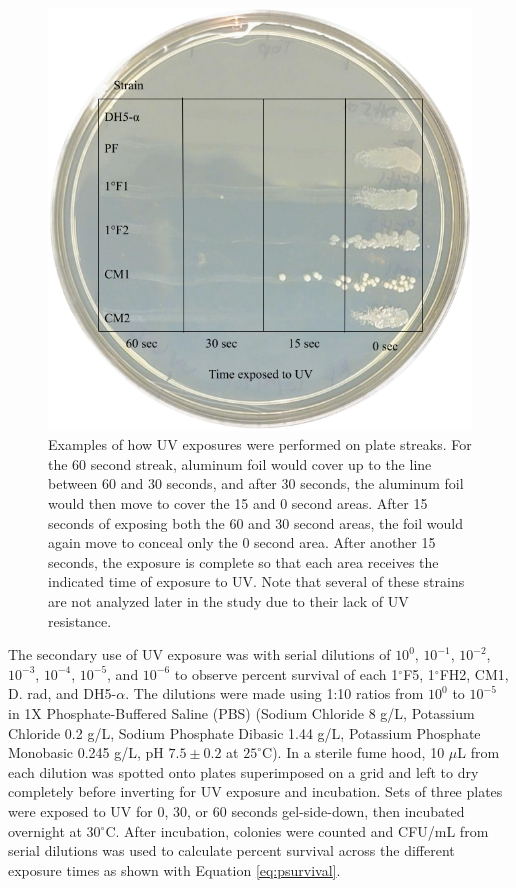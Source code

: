 \documentclass[12pt,twoside]{reedthesis}
\begin{document}
\begin{figure}[t]
\centering
\includegraphics[width=\textwidth]{figure/StreakUV.png}
\caption[Streak UV]{Examples of how UV exposures were performed on plate streaks. For the 60 second streak, aluminum foil would cover up to the line between 60 and 30 seconds, and after 30 seconds, the aluminum foil would then move to cover the 15 and 0 second areas. After 15 seconds of exposing both the 60 and 30 second areas, the foil would again move to conceal only the 0 second area. After another 15 seconds, the exposure is complete so that each area receives the indicated time of exposure to UV. Note that several of these strains are not analyzed later in the study due to their lack of UV resistance.}
\label{fig:StreakUV}
\end{figure}
The secondary use of UV exposure was with serial dilutions of \(10^0\), \(10^{-1}\), \(10^{-2}\), \(10^{-3}\), \(10^{-4}\), \(10^{-5}\), and \(10^{-6}\) to observe percent survival of each 1\(^{\circ}\)F5, 1\(^{\circ}\)FH2, CM1, D. rad, and DH5-\(\alpha\). The dilutions were made using 1:10 ratios from \(10^0\) to \(10^{-5}\) in 1X Phosphate-Buffered Saline (PBS) (Sodium Chloride 8 g/L, Potassium Chloride 0.2 g/L, Sodium Phosphate Dibasic 1.44 g/L, Potassium Phosphate Monobasic 0.245 g/L, pH \(7.5 \pm 0.2\) at \(25^{\circ}\)C). In a sterile fume hood, 10 \(\mu\)L from each dilution was spotted onto plates superimposed on a grid and left to dry completely before inverting for UV exposure and incubation. Sets of three plates were exposed to UV for 0, 30, or 60 seconds gel-side-down, then incubated overnight at 30\(^{\circ}\)C. After incubation, colonies were counted and CFU/mL from serial dilutions was used to calculate percent survival across the different exposure times as shown with Equation \eqref{eq:psurvival}.
\end{document}
